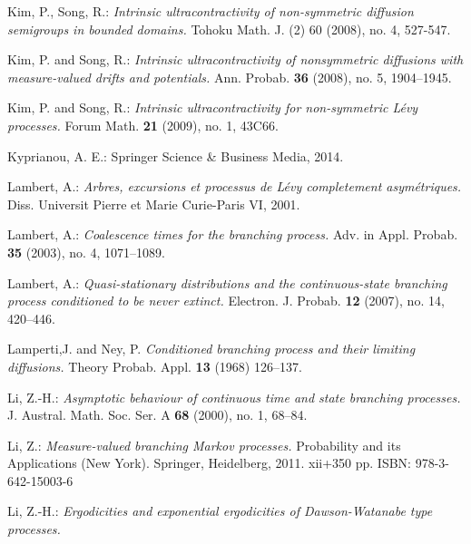 \documentclass[12pt,a4paper]{amsart}
\numberwithin{equation}{section}
\theoremstyle{plain}
\theoremstyle{definition}
\theoremstyle{remark}
\begin{document}
\begin{thebibliography}{99}
Kim, P., Song, R.:
\emph{Intrinsic ultracontractivity of non-symmetric diffusion semigroups in bounded domains.}
Tohoku Math. J. (2) 60 (2008), no. 4, 527-547.

Kim, P. and Song, R.:
\emph{Intrinsic ultracontractivity of nonsymmetric diffusions with measure-valued drifts and potentials.}
Ann. Probab. \textbf{36} (2008), no. 5, 1904--1945.

Kim, P. and Song, R.:
\emph{Intrinsic ultracontractivity for non-symmetric L\'evy processes.}
Forum Math. \textbf{21} (2009), no. 1, 43C66.

	Kyprianou, A. E.:
	Springer Science \& Business Media, 2014.

Lambert, A.:
\emph{Arbres, excursions et processus de L\'evy completement asym\'etriques.}
Diss. Universit Pierre et Marie Curie-Paris VI, 2001.

Lambert, A.:
\emph{Coalescence times for the branching process.}
Adv. in Appl. Probab. \textbf{35} (2003), no. 4, 1071--1089.

Lambert, A.:
\emph{Quasi-stationary distributions and the continuous-state branching process conditioned to be never extinct.}
Electron. J. Probab. \textbf{12} (2007), no. 14, 420--446.

Lamperti,J. and Ney, P. \emph{Conditioned branching process and their limiting diffusions.} Theory Probab. Appl. \textbf{13} (1968)
126--137.

Li, Z.-H.:
\emph{Asymptotic behaviour of continuous time and state branching processes.}
J. Austral. Math. Soc. Ser. A \textbf{68} (2000), no. 1, 68--84.

Li, Z.:
\emph{Measure-valued branching Markov processes.}
Probability and its Applications (New York). Springer, Heidelberg, 2011. xii+350 pp. ISBN: 978-3-642-15003-6

Li, Z.-H.:
\emph{Ergodicities and exponential ergodicities of Dawson-Watanabe type processes.} 


\end{thebibliography}
\end{document}

